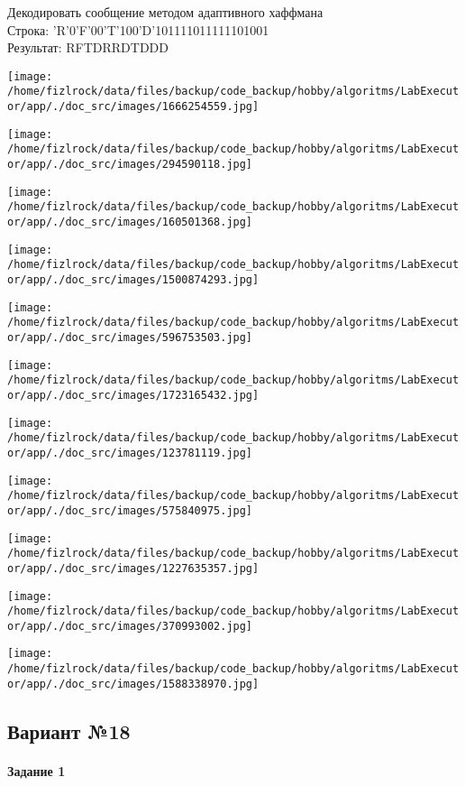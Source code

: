 \documentclass[a4paper, 12pt]{article}
\begin{document}
Декодировать сообщение методом адаптивного хаффмана \\
Строка: 
'R'0'F'00'T'100'D'101111011111101001\\
Результат: RFTDRRDTDDD

\texttt{[image: /home/fizlrock/data/files/backup/code\_backup/hobby/algoritms/LabExecutor/app/./doc\_src/images/1666254559.jpg]}

\texttt{[image: /home/fizlrock/data/files/backup/code\_backup/hobby/algoritms/LabExecutor/app/./doc\_src/images/294590118.jpg]}

\texttt{[image: /home/fizlrock/data/files/backup/code\_backup/hobby/algoritms/LabExecutor/app/./doc\_src/images/160501368.jpg]}

\texttt{[image: /home/fizlrock/data/files/backup/code\_backup/hobby/algoritms/LabExecutor/app/./doc\_src/images/1500874293.jpg]}

\texttt{[image: /home/fizlrock/data/files/backup/code\_backup/hobby/algoritms/LabExecutor/app/./doc\_src/images/596753503.jpg]}

\texttt{[image: /home/fizlrock/data/files/backup/code\_backup/hobby/algoritms/LabExecutor/app/./doc\_src/images/1723165432.jpg]}

\texttt{[image: /home/fizlrock/data/files/backup/code\_backup/hobby/algoritms/LabExecutor/app/./doc\_src/images/123781119.jpg]}

\texttt{[image: /home/fizlrock/data/files/backup/code\_backup/hobby/algoritms/LabExecutor/app/./doc\_src/images/575840975.jpg]}

\texttt{[image: /home/fizlrock/data/files/backup/code\_backup/hobby/algoritms/LabExecutor/app/./doc\_src/images/1227635357.jpg]}

\texttt{[image: /home/fizlrock/data/files/backup/code\_backup/hobby/algoritms/LabExecutor/app/./doc\_src/images/370993002.jpg]}

\texttt{[image: /home/fizlrock/data/files/backup/code\_backup/hobby/algoritms/LabExecutor/app/./doc\_src/images/1588338970.jpg]}
\pagebreak
\subsection{Вариант №18}
\paragraph{Задание 1}
\end{document}
